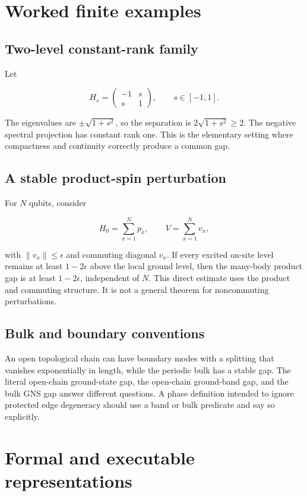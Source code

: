 \documentclass[12pt]{article}
\theoremstyle{definition}
\theoremstyle{remark}
\begin{document}
\section{Worked finite examples}

\subsection{Two-level constant-rank family}

Let

\[
H_s=
\begin{pmatrix}
-1 & s\\
s & 1
\end{pmatrix},
\qquad
s\in[-1,1].
\]

The eigenvalues are $\pm\sqrt{1+s^2}$, so the separation is
$2\sqrt{1+s^2}\geq2$. The negative spectral projection has constant rank one.
This is the elementary setting where compactness and continuity correctly
produce a common gap.

\subsection{A stable product-spin perturbation}

For $N$ qubits, consider

\[
H_0=\sum_{x=1}^N p_x,
\qquad
V=\sum_{x=1}^N v_x,
\]

with $\|v_x\|\leq\epsilon$ and commuting diagonal $v_x$. If every excited
on-site level remains at least $1-2\epsilon$ above the local ground level,
then the many-body product gap is at least $1-2\epsilon$, independent of $N$.
This direct estimate uses the product and commuting structure. It is not a
general theorem for noncommuting perturbations.

\subsection{Bulk and boundary conventions}

An open topological chain can have boundary modes with a splitting that
vanishes exponentially in length, while the periodic bulk has a stable gap.
The literal open-chain ground-state gap, the open-chain ground-band gap, and
the bulk GNS gap answer different questions. A phase definition intended to
ignore protected edge degeneracy should use a band or bulk predicate and say
so explicitly.

\section{Formal and executable representations}
\end{document}
